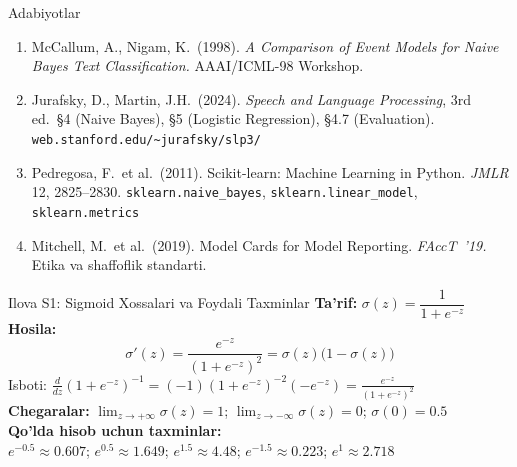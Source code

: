 \documentclass[aspectratio=169,11pt]{beamer}
\begin{document}
\begin{frame}{Adabiyotlar}
  \small
  \begin{enumerate}\setlength{\itemsep}{5pt}
    \item McCallum, A., Nigam, K.\ (1998).
          \textit{A Comparison of Event Models for Naive Bayes
          Text Classification.} AAAI/ICML-98 Workshop.

    \item Jurafsky, D., Martin, J.H.\ (2024).
          \textit{Speech and Language Processing}, 3rd ed.\
          \S4 (Naive Bayes), \S5 (Logistic Regression),
          \S4.7 (Evaluation).
          \textcolor{halfgray}{\footnotesize
            \texttt{web.stanford.edu/\textasciitilde jurafsky/slp3/}}

    \item Pedregosa, F.\ et al.\ (2011).
          Scikit-learn: Machine Learning in Python.
          \textit{JMLR} 12, 2825--2830.
          \textcolor{halfgray}{\footnotesize
            \texttt{sklearn.naive\_bayes},
            \texttt{sklearn.linear\_model},
            \texttt{sklearn.metrics}}

    \item Mitchell, M.\ et al.\ (2019).
          Model Cards for Model Reporting.
          \textit{FAccT~'19.}
          \textcolor{halfgray}{\footnotesize
            Etika va shaffoflik standarti.}
  \end{enumerate}
\end{frame}

\appendix

\begin{frame}{Ilova S1: Sigmoid Xossalari va Foydali Taxminlar}
  \small
  \textbf{Ta'rif:}\quad
  $\sigma(z)=\dfrac{1}{1+e^{-z}}$\\[6pt]
  \textbf{Hosila:}
  \[
    \sigma'(z)
    =\frac{e^{-z}}{(1+e^{-z})^2}
    =\sigma(z)\bigl(1-\sigma(z)\bigr)
  \]
  \textcolor{halfgray}{\footnotesize
    Isboti: $\tfrac{d}{dz}(1+e^{-z})^{-1}
    =(-1)(1+e^{-z})^{-2}(-e^{-z})=\tfrac{e^{-z}}{(1+e^{-z})^2}$}\\[5pt]
  \textbf{Chegaralar:}
  $\lim_{z\to+\infty}\sigma(z)=1$;\quad
  $\lim_{z\to-\infty}\sigma(z)=0$;\quad
  $\sigma(0)=0.5$\\[5pt]
  \textbf{Qo'lda hisob uchun taxminlar:}\\[3pt]
  $e^{-0.5}\approx 0.607$;\quad
  $e^{0.5}\approx 1.649$;\quad
  $e^{1.5}\approx 4.48$;\quad
  $e^{-1.5}\approx 0.223$;\quad
  $e^{1}\approx 2.718$
\end{frame}
\end{document}
